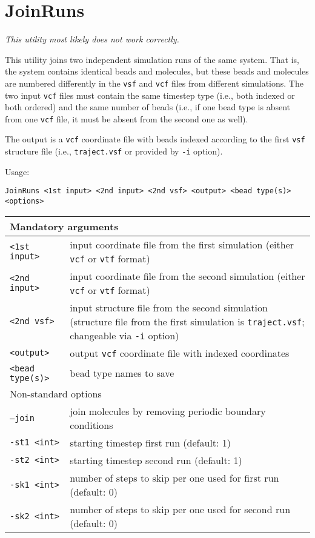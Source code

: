 \section{JoinRuns} \label{sec:JoinRuns}

{\it This utility most likely does not work correctly.}

This utility joins two independent simulation runs of the same system.
That is, the system contains identical beads and molecules, but these beads
and molecules are numbered differently in the \texttt{vsf} and \texttt{vcf}
files from different simulations. The two input \texttt{vcf} files must
contain the same timestep type (i.e., both indexed or both ordered) and the
same number of beads (i.e., if one bead type is absent from one
\texttt{vcf} file, it must be absent from the second one as well).

The output is a \texttt{vcf} coordinate file with beads indexed according
to the first \texttt{vsf} structure file (i.e., \texttt{traject.vsf} or
provided by \texttt{-i} option).

Usage:

\vspace{1em}
\noindent
\texttt{JoinRuns <1st input> <2nd input> <2nd vsf> <output> <bead type(s)> \\ <options>}

\vspace{1em}
\noindent
\begin{longtable}{p{}p{}}
  \toprule
  \multicolumn{2}{l}{Mandatory arguments} \\
  \midrule
  \texttt{<1st input>} & input coordinate file from the first simulation (either \texttt{vcf} or
    \texttt{vtf} format) \\
  \texttt{<2nd input>} & input coordinate file from the second simulation (either \texttt{vcf} or
    \texttt{vtf} format) \\
  \texttt{<2nd vsf>} & input structure file from the second simulation
    (structure file from the first simulation is \texttt{traject.vsf};
    changeable via \texttt{-i} option) \\
  \texttt{<output>} & output \texttt{vcf} coordinate file with indexed
    coordinates \\
  \texttt{<bead type(s)>} & bead type names to save \\
  \toprule
  \multicolumn{2}{l}{Non-standard options} \\
  \midrule
  \texttt{--join} & join molecules by removing periodic boundary conditions \\
  \texttt{-st1 <int>} & starting timestep first run (default: 1) \\
  \texttt{-st2 <int>} & starting timestep second run (default: 1) \\
  \texttt{-sk1 <int>} & number of steps to skip per one used for first run (default: 0) \\
  \texttt{-sk2 <int>} & number of steps to skip per one used for second run (default: 0) \\
  \bottomrule
\end{longtable}

